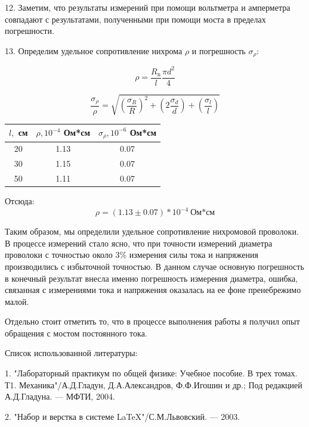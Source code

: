 \documentclass[14pt]{article}
\begin{document}
	
	\vspace{0.5cm}
	12. Заметим, что результаты измерений при помощи вольтметра и амперметра совпадают с результатами, полученными при помощи
	моста в пределах погрешности.
	
	\vspace{0.5cm}
	13. Определим удельное сопротивление нихрома $\rho$ и погрешность $\sigma_\rho$:
	
	$$\rho = \frac{R_\text{n}}{l}\frac{\pi d^2}{4}$$
	
	$$\frac{\sigma_\rho}{\rho} = \sqrt{\left(\frac{\sigma_R}{R}\right)^2 + \left(2\frac{\sigma_d}{d}\right) + 
	\left(\frac{\sigma_l}{l}\right)}$$	
	
	\vspace{0.5cm}
	\begin{center}
	\begin{tabular}{|c|c|c|}
	\hline
	$l,$ см 	& $\rho, 10^{-4}$ Ом*см 	& $\sigma_\rho, 10^{-6}$ Ом*см\\
	\hline
	20			& 1.13 						& 0.07\\
	\hline
	30			& 1.15						& 0.07\\
	\hline
	50			& 1.11						& 0.07\\ 
	\hline
	\end{tabular}
	\end{center}
	
	\vspace{1cm}
	Отсюда:	
	$$\boxed{\boxed{\rho = (1.13 \pm 0.07)*10^{-4}~\text{Ом*см}}}$$
	
	\vspace{1cm}
	Таким образом, мы определили удельное сопротивление нихромовой проволоки. В процессе измерений стало ясно, что при точности
	измерений диаметра проволоки с точностью около 3\% измерения силы тока и напряжения производились с избыточной точностью. В данном 
	случае основную погрешность в конечный результат внесла именно погрешность измерения диаметра, ошибка, связанная с измерениями
	тока и напряжения оказалась на ее фоне пренебрежимо малой.
	
	Отдельно стоит отметить то, что в процессе выполнения работы я получил опыт обращения с мостом постоянного тока. 
	
	\newpage
	Список использованной литературы:
	
	\vspace{0.5cm}
	1. "Лабораторный практикум по общей физике: Учебное пособие. В трех томах. Т1. Механика"/А.Д.Гладун, Д.А.Александров,
	Ф.Ф.Игошин и др.; Под редакцией А.Д.Гладуна. --- МФТИ, 2004.
	
	2. "Набор и верстка в системе \LaTeX "/С.М.Львовский. --- 2003.
	
\end{document}
